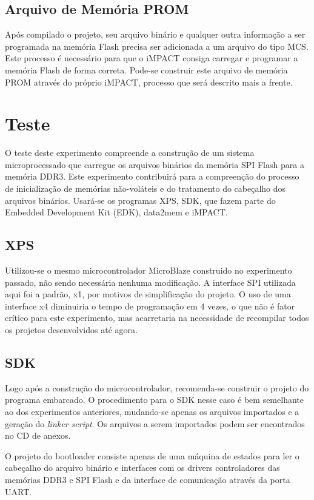 \documentclass[11pt,a4paper,oneside]{book}
\begin{document}
\subsection{Arquivo de Memória PROM}
Após compilado o projeto, seu arquivo binário e qualquer outra informação a ser programada na memória Flash precisa ser adicionada a um arquivo do tipo MCS.
Este processo é necessário para que o iMPACT consiga carregar e programar a memória Flash de forma correta.
Pode-se construir este arquivo de memória PROM através do próprio iMPACT, processo que será descrito mais a frente.

\section{Teste}
O teste deste experimento compreende a construção de um sistema microprocessado que carregue os arquivos binários da memória SPI Flash para a memória DDR3.
Este experimento contribuirá para a compreenção do processo de inicialização de memórias não-voláteis e do tratamento do cabeçalho dos arquivos binários.
Usará-se os programas XPS, SDK, que fazem parte do Embedded Development Kit (EDK), data2mem e iMPACT.

\subsection{XPS}
Utilizou-se o mesmo microcontrolador MicroBlaze construido no experimento passado, não sendo necessária nenhuma modificação.
A interface SPI utilizada aqui foi a padrão, x1, por motivos de simplificação do projeto.
O uso de uma interface x4 diminuiria o tempo de programação em 4 vezes, o que não é fator crítico para este experimento, mas acarretaria na necessidade de recompilar todos os projetos desenvolvidos até agora.

\subsection{SDK}
Logo após a construção do microcontrolador, recomenda-se construir o projeto do programa embarcado.
O procedimento para o SDK nesse caso é bem semelhante ao dos experimentos anteriores, mudando-se apenas os arquivos importados e a geração do \textit{linker script}.
Os arquivos a serem importados podem ser encontrados no CD de anexos.

O projeto do bootloader consiste apenas de uma máquina de estados para ler o cabeçalho do arquivo binário e interfaces com os drivers controladores das memórias DDR3 e SPI Flash e da interface de comunicação através da porta UART.
\end{document}
